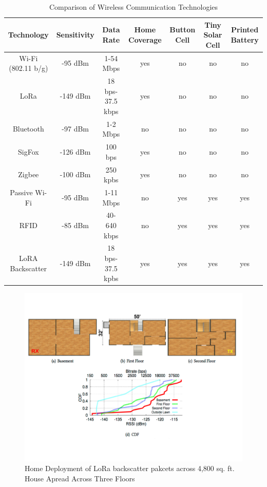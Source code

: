 \documentclass[sigconf]{acmart}
\begin{document}
\begin{table}
  \caption{Comparison of Wireless Communication Technologies \cite{talla17}}
  \label{tab:freq}
  \begin{tabular}{ccccccc}
    \toprule
     Technology& Sensitivity& Data Rate& Home Coverage& Button Cell& Tiny Solar Cell& Printed Battery \\
    \midrule
    Wi-Fi (802.11 b/g)& -95 dBm& 1-54 Mbps& yes& no& no& no \\
    LoRa& -149 dBm& 18 bps-37.5 kbps& yes& no& no& no \\
    Bluetooth& -97 dBm& 1-2 Mbps& no& no& no& no \\
    SigFox& -126 dBm& 100 bps& yes& no& no& no \\
    Zigbee& -100 dBm& 250 kpbs& yes& no& no& no \\
    Passive Wi-Fi& -95 dBm& 1-11 Mbps& no& yes& yes& yes \\
    RFID& -85 dBm& 40-640 kbps& no& yes& yes& yes \\
    LoRA Backscatter& -149 dBm& 18 bps-37.5 kpbs& yes& yes& yes& yes \\
    \bottomrule
  \end{tabular}
\end{table}

\begin{figure}[!ht]
  \centering\includegraphics[width=\columnwidth]{images/Figure5.pdf}
  \caption{Home Deployment of LoRa backscatter pakcets across 4,800 sq. ft.
  House Apread Across Three Floors \cite{talla17}
  }\label{f:Figure5}
\end{figure}
\end{document}
